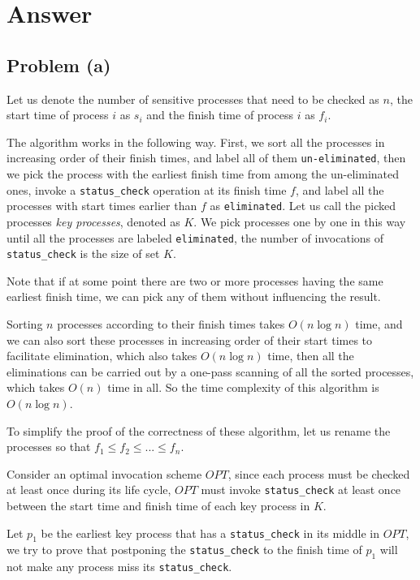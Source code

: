 \documentclass[12pt,letterpaper]{article}
\begin{document}
\section*{Answer}
\subsection*{Problem (a)}
Let us denote the number of sensitive processes that need to be checked as $n$, the start time of process $i$ as $s_i$ and the finish time of process $i$ as $f_i$. 

The algorithm works in the following way. First, we sort all the processes in increasing order of their finish times, and label all of them \texttt{un-eliminated}, then we pick the process with the earliest finish time from among the un-eliminated ones, invoke a \texttt{status\_check} operation at its finish time $f$, and label all the processes with start times earlier than $f$ as \texttt{eliminated}. Let us call the picked processes \emph{key processes}, denoted as $K$. We pick processes one by one in this way until all the processes are labeled \texttt{eliminated}, the number of invocations of \texttt{status\_check} is the size of set $K$.

Note that if at some point there are two or more processes having the same earliest finish time, we can pick any of them without influencing the result. 

Sorting $n$ processes according to their finish times takes $O(n\log n)$ time, and we can also sort these processes in increasing order of their start times to facilitate elimination, which also takes $O(n\log n)$ time, then all the eliminations can be carried out by a one-pass scanning of all the sorted processes, which takes $O(n)$ time in all. So the time complexity of this algorithm is $O(n\log n)$.

To simplify the proof of the correctness of these algorithm, let us rename the processes so that $f_1 \le f_2 \le ... \le f_n$.

Consider an optimal invocation scheme $OPT$, since each process must be checked at least once during its life cycle, $OPT$ must invoke \texttt{status\_check} at least once between the start time and finish time of each key process in $K$.

Let $p_1$ be the earliest key process that has a \texttt{status\_check} in its middle in $OPT$, we try to prove that postponing the \texttt{status\_check} to the finish time of $p_1$ will not make any process miss its \texttt{status\_check}.
\end{document}
